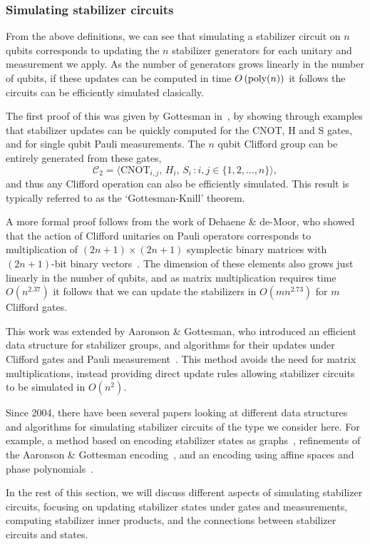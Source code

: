 \subsubsection{Simulating stabilizer circuits}
From the above definitions, we can see that simulating a stabilizer circuit on $n$ qubits corresponds to updating the $n$ stabilizer generators for each unitary and measurement we apply. As the number of generators grows linearly in the number of qubits, if these updates can be computed in time $O\left(\text{poly} (n)\right)$ it follows the circuits can be efficiently simulated clasically.\par
The first proof of this was given by Gottesman in~\cite{Gottesman1998b}, by showing through examples that stabilizer updates can be quickly computed for the CNOT, H and S gates, and for single qubit Pauli measurements. The $n$ qubit Clifford group can be entirely generated from these gates,
\begin{equation}
    \mathcal{C}_{2} = \langle \text{CNOT}_{i,j},\, H_{i},\, S_{i}\,:i,j\in \{1,2,\dots,n\}\rangle, \label{eq:cliffordgen}
\end{equation}
and thus any Clifford operation can also be efficiently simulated. This result is typically referred to as the `Gottesman-Knill' theorem.\par
A more formal proof follows from the work of Dehaene \& de-Moor, who showed that the action of Clifford unitaries on Pauli operators corresponds to multiplication of $(2n+1)\times (2n+1)$ symplectic binary matrices with $(2n+1)$-bit binary vectors~\cite{Dehaene2003}. The dimension of these elements also grows just linearly in the number of qubits, and as matrix multiplication requires time $O(n^{2.37})$ it follows that we can update the stabilizers in $O(mn^{2.73})$ for $m$ Clifford gates.\par
This work was extended by Aaronson \& Gottesman, who introduced an efficient data structure for stabilizer groups, and algorithms for their updates under Clifford gates and Pauli measurement~\cite{Aaronson2004}. This method avoids the need for matrix multiplications, instead providing direct update rules allowing stabilizer circuits to be simulated in $O(n^{2})$.\par
Since 2004, there have been several papers looking at different data structures and algorithms for simulating stabilizer circuits of the type we consider here. For example, a method based on encoding stabilizer states as graphs~\cite{Anders2006}, refinements of the Aaronson \& Gottesman encoding~\cite{Garcia2012}, and an encoding using affine spaces and phase polynomials~\cite{VandenNest2008,Bravyi2016}.\par
In the rest of this section, we will discuss different aspects of simulating stabilizer circuits, focusing on updating stabilizer states under gates and measurements, computing stabilizer inner products, and the connections between stabilizer circuits and states.

